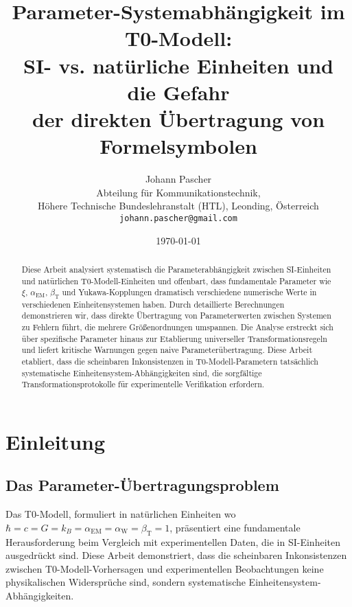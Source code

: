 \documentclass[12pt,a4paper]{article}
\newcommand{\xipar}{\xi}
\begin{document}
	
	\title{Parameter-Systemabhängigkeit im T0-Modell: \\
		SI- vs. natürliche Einheiten und die Gefahr \\
		der direkten Übertragung von Formelsymbolen}
	\author{Johann Pascher\\
		Abteilung für Kommunikationstechnik, \\H{\"o}here Technische Bundeslehranstalt (HTL), Leonding, Österreich\\
		\texttt{johann.pascher@gmail.com}}
	\date{\today}
	
	\maketitle
	
	\begin{abstract}
		Diese Arbeit analysiert systematisch die Parameterabhängigkeit zwischen SI-Einheiten und natürlichen T0-Modell-Einheiten und offenbart, dass fundamentale Parameter wie $\xipar$, $\alpha_{\text{EM}}$, $\beta_{\text{T}}$ und Yukawa-Kopplungen dramatisch verschiedene numerische Werte in verschiedenen Einheitensystemen haben. Durch detaillierte Berechnungen demonstrieren wir, dass direkte Übertragung von Parameterwerten zwischen Systemen zu Fehlern führt, die mehrere Größenordnungen umspannen. Die Analyse erstreckt sich über spezifische Parameter hinaus zur Etablierung universeller Transformationsregeln und liefert kritische Warnungen gegen naive Parameterübertragung. Diese Arbeit etabliert, dass die scheinbaren Inkonsistenzen in T0-Modell-Parametern tatsächlich systematische Einheitensystem-Abhängigkeiten sind, die sorgfältige Transformationsprotokolle für experimentelle Verifikation erfordern.
	\end{abstract}
	
	\tableofcontents
	\newpage
	
	\section{Einleitung}
	\label{sec:einleitung}
	
	\subsection{Das Parameter-Übertragungsproblem}
	\label{subsec:parameter_problem}
	
	Das T0-Modell, formuliert in natürlichen Einheiten wo $\hbar = c = G = k_B = \alpha_{\text{EM}} = \alpha_{\text{W}} = \beta_{\text{T}} = 1$, präsentiert eine fundamentale Herausforderung beim Vergleich mit experimentellen Daten, die in SI-Einheiten ausgedrückt sind. Diese Arbeit demonstriert, dass die scheinbaren Inkonsistenzen zwischen T0-Modell-Vorhersagen und experimentellen Beobachtungen keine physikalischen Widersprüche sind, sondern systematische Einheitensystem-Abhängigkeiten.
	
\end{document}
